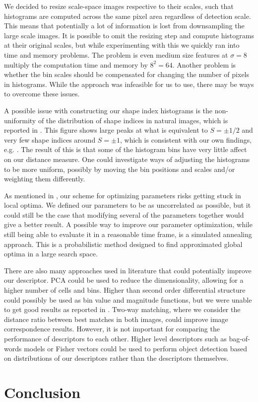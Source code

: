 \documentclass[thesis.tex]{subfiles}
\begin{document}
We decided to resize scale-space images respective to their scales, such that histograms are computed across the same pixel area regardless of detection scale. This means that potentially a lot of information is lost from downsampling the large scale images. It is possible to omit the resizing step and compute histograms at their original scales, but while experimenting with this we quickly ran into time and memory problems. The problem is even medium size features at $\sigma = 8$ multiply the computation time and memory by $8^2 = 64$. Another problem is whether the bin scales should be compensated for changing the number of pixels in histograms. While the approach was infeasible for us to use, there may be ways to overcome these issues.

A possible issue with constructing our shape index histograms is the non-uniformity of the distribution of shape indices in natural images, which is reported in \citep[Fig. 3]{lillholm2009statistics}. This figure shows large peaks at what is equivalent to $S = \pm 1/2$ and very few shape indices around $S = \pm 1$, which is consistent with our own findings, e.g. . The result of this is that some of the histogram bins have very little affect on our distance measure. One could investigate ways of adjusting the histograms to be more uniform, possibly by moving the bin positions and scales and/or weighting them differently.

As mentioned in , our scheme for optimizing parameters risks getting stuck in local optima. We defined our parameters to be as uncorrelated as possible, but it could still be the case that modifying several of the parameters together would give a better result. A possible way to improve our parameter optimization, while still being able to evaluate it in a reasonable time frame, is a simulated annealing approach. This is a probabilistic method designed to find approximated global optima in a large search space. 

There are also many approaches used in literature that could potentially improve our descriptor. PCA could be used to reduce the dimensionality, allowing for a higher number of cells and bins. Higher than second order differential structure could possibly be used as bin value and magnitude functions, but we were unable to get good results as reported in . Two-way matching, where we consider the distance ratio between best matches in both images, could improve image correspondence results. However, it is not important for comparing the performance of descriptors to each other. Higher level descriptors such as bag-of-words models or Fisher vectors \cite{sanchez2013image} could be used to perform object detection based on distributions of our descriptors rather than the descriptors themselves.

\section{Conclusion}

\subbibliography
\end{document}
